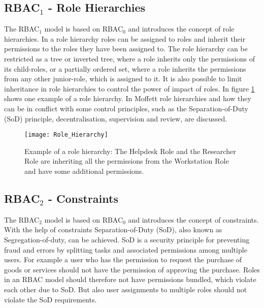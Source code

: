         \subsection{RBAC$_1$ - Role Hierarchies}
        \label{sec:rolehierarchies}
            The RBAC$_1$ model is based on RBAC$_0$ and introduces the concept of role hierarchies. In a role hierarchy roles can be assigned to roles and inherit their permissions to the roles they have been assigned to. The role hierarchy can be restricted as a tree or inverted tree, where a role inherits only the permissions of its child-roles, or a partially ordered set, where a role inherits the permissions from any other junior-role, which is assigned to it. It is also possible to limit inheritance in role hierarchies to control the power of impact of roles. In figure \ref{fig:rolehierarchies} shows one example of a role hierarchy.
            In Moffett\cite{Moffett:1998} role hierarchies and how they can be in conflict with some control principles, such as the Separation-of-Duty (SoD) principle, decentralisation, supervision and review, are discussed.
            \begin{figure}[H]
                \centering
                \texttt{[image: Role\_Hierarchy]}
                \caption{Example of a role hierarchy: The Helpdesk Role and the Researcher Role are inheriting all the permissions from the Workstation Role and have some additional permissions.}
                \label{fig:rolehierarchies}
            \end{figure}
        \subsection{RBAC$_2$ - Constraints}
        \label{sec:rbac2}
            The RBAC$_2$ model is based on RBAC$_0$ and introduces the concept of constraints. With the help of constraints Separation-of-Duty (SoD), also known as Segregation-of-duty, can be achieved. SoD is a security principle for preventing fraud and errors by splitting tasks and associated permissions among multiple users. For example a user who has the permission to request the purchase of goods or services should not have the permission of approving the purchase. Roles in an RBAC model should therefore not have permissions bundled, which violate each other due to SoD. But also user assignments to multiple roles should not violate the SoD requirements.
